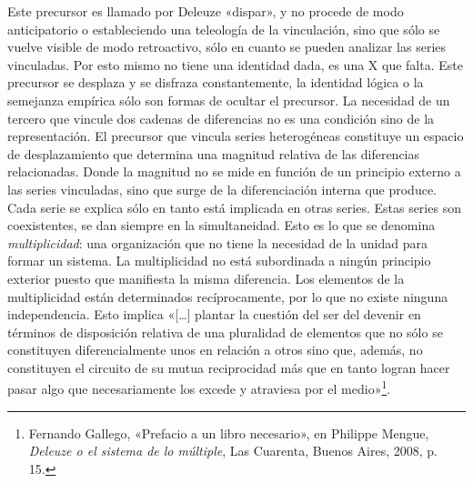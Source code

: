 Este precursor es llamado por Deleuze «dispar», y no procede de modo anticipatorio o estableciendo una teleología de la vinculación, sino que sólo se vuelve visible de modo retroactivo, sólo en cuanto se pueden analizar las series vinculadas. Por esto mismo no tiene una identidad dada, es una X que falta. Este precursor se desplaza y se disfraza constantemente, la identidad lógica o la semejanza empírica sólo son formas de ocultar el precursor. La necesidad de un tercero que vincule dos cadenas de diferencias no es una condición sino de la representación. El precursor que vincula series heterogéneas constituye un espacio de desplazamiento que determina una magnitud relativa de las diferencias relacionadas. Donde la magnitud no se mide en función de un principio externo a las series vinculadas, sino que surge de la diferenciación interna que produce. Cada serie se explica sólo en tanto está implicada en otras series. Estas series son coexistentes, se dan siempre en la simultaneidad. Esto es lo que se denomina \emph{multiplicidad}: una organización que no tiene la necesidad de la unidad para formar un sistema. La multiplicidad no está subordinada a ningún principio exterior puesto que manifiesta la misma diferencia. Los elementos de la multiplicidad están determinados recíprocamente, por lo que no existe ninguna independencia. Esto implica «{[}\ldots{]} plantar la cuestión del ser del devenir en términos de disposición relativa de una pluralidad de elementos que no sólo se constituyen diferencialmente unos en relación a otros sino que, además, no constituyen el circuito de su mutua reciprocidad más que en tanto logran hacer pasar algo que necesariamente los excede y atraviesa por el medio»\footnote{Fernando Gallego, «Prefacio a un libro necesario», en Philippe Mengue, \emph{Deleuze o el sistema de lo múltiple}, Las Cuarenta, Buenos Aires, 2008, p. 15.}.

